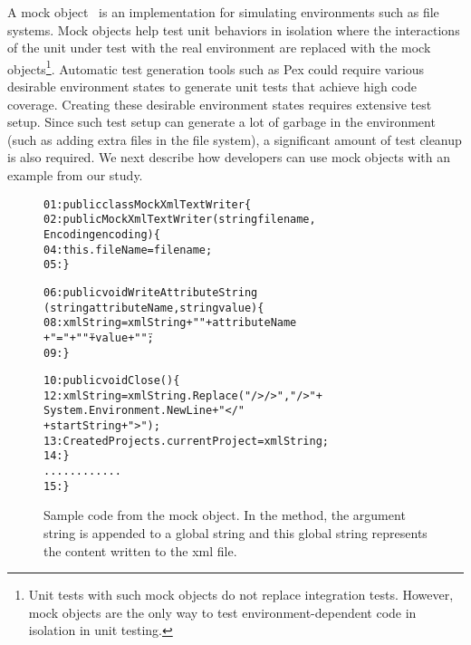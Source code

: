 A mock object~\cite{mockobjects} is an implementation for simulating environments such as file systems. Mock objects help test unit behaviors in isolation where the interactions of the unit under test with the real environment are replaced with the mock objects\footnote{Unit tests with such mock objects do not replace integration tests. However, mock objects are the only way to test environment-dependent code in isolation in unit testing.}. Automatic test generation tools such as Pex could require various desirable environment states to generate unit tests that achieve high code coverage. Creating these desirable environment states requires extensive test setup. Since such test setup can generate a lot of garbage in the environment (such as adding extra files in the file system), a significant amount of test cleanup is also required. We next describe how developers can use mock objects with an example from our study. 

\begin{figure}
\begin{CodeOut}
\begin{alltt}
01: public class MockXmlTextWriter \{ 
02:\hspace*{0.1in}public MockXmlTextWriter(string filename,
\hspace*{0.25in} Encoding encoding) \{ 
04:\hspace*{0.3in}this.fileName = filename;
05:\hspace*{0.1in}\}

06:\hspace*{0.1in}public void WriteAttributeString
\hspace*{0.3in}(string attributeName, string value) \{
08:\hspace*{0.3in}xmlString = xmlString + " " + attributeName 
\hspace*{0.7in}+ "=" + "\"" + value + "\"";
09:\hspace*{0.1in}\}

10:\hspace*{0.1in}public void Close() \{
12:\hspace*{0.3in}xmlString = xmlString.Replace("/> />", "/>" + 
   \hspace*{0.5in}System.Environment.NewLine + "</" 
   \hspace*{0.7in}+ startString + ">");
13:\hspace*{0.3in}CreatedProjects.currentProject = xmlString;
14:\hspace*{0.1in}\}
\hspace*{0.3in}............
15: \}
\end{alltt}
\end{CodeOut}  \vspace*{-3ex}
\caption{\label{fig:mockobject} Sample code from the  mock object. In the  method, the argument string is appended to a global string  and this global string represents the content written to the xml file.}  \vspace*{-3ex}
\end{figure}


